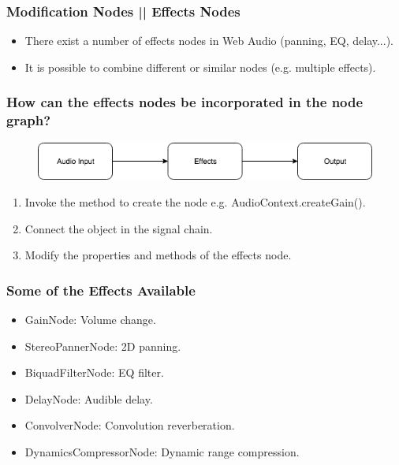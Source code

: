 \documentclass[screen, aspectratio=43]{beamer}
\begin{document}
%
%
\begin{frame}
\frametitle{Modification Nodes || Effects Nodes}
\begin{itemize}
\item There exist a number of effects nodes in Web Audio (panning, EQ, delay...).
\item It is possible to combine different or similar nodes (e.g. multiple effects).
\end{itemize}
\end{frame}
%
\begin{frame}
\frametitle{How can the effects nodes be incorporated in the node graph?}
   \begin{figure}
	\includegraphics[scale=0.35]{img/Routing-audio-nodes-02-low-pass-filter.png}
\end{figure}
\begin{enumerate}
\item Invoke the method to create the node e.g. \textrm{AudioContext.createGain()}.
\item Connect the object in the signal chain.
\item Modify the properties and methods of the effects node.
\end{enumerate}
\end{frame}
%
\begin{frame}
\frametitle{Some of the Effects Available}
\begin{itemize}
\item \textrm{GainNode}: Volume change.
\item \textrm{StereoPannerNode}: 2D panning.
\item \textrm{BiquadFilterNode}: EQ filter.
\item \textrm{DelayNode}: Audible delay.
\item \textrm{ConvolverNode}: Convolution reverberation.
\item \textrm{DynamicsCompressorNode}: Dynamic range compression.
\end{itemize}
\end{frame}
\end{document}
